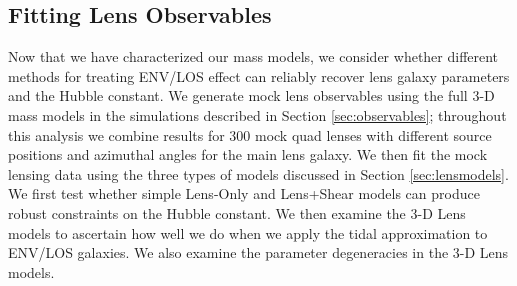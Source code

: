 \documentclass{emulateapj}
\begin{document}
\subsection{Fitting Lens Observables}
\label{sec:fitting}
Now that we have characterized our mass models, we consider whether different methods for treating ENV/LOS effect can reliably recover lens galaxy parameters and the Hubble constant. We generate mock lens observables using the full 3-D mass models in the simulations described in Section \ref{sec:observables}; throughout this analysis we combine results for 300 mock quad lenses with different source positions and azimuthal angles for the main lens galaxy. We then fit the mock lensing data using the three types of models discussed in Section \ref{sec:lensmodels}. We first test whether simple Lens-Only and Lens+Shear models can produce robust constraints on the Hubble constant. We then examine the 3-D Lens models to ascertain how well we do when we apply the tidal approximation to ENV/LOS galaxies. We also examine the parameter degeneracies in the 3-D Lens models.
\end{document}
